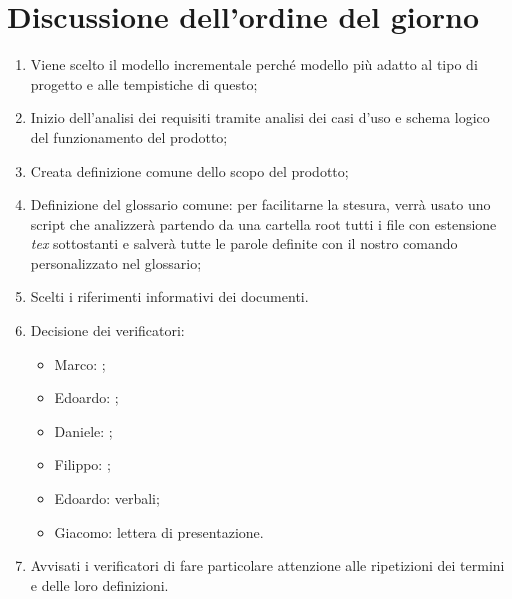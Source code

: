 \documentclass[../verbale-2016-12-19.tex]{subfiles}
\begin{document}
	\section{Discussione dell'ordine del giorno}
	\begin{enumerate}
		\item Viene scelto il modello incrementale perché modello più adatto al tipo di progetto e alle tempistiche di questo;
		\item Inizio dell'analisi dei requisiti tramite analisi dei casi d'uso e schema logico del funzionamento del prodotto;
		\item Creata definizione comune dello scopo del prodotto;
		\item Definizione del glossario comune: per facilitarne la stesura, verrà usato uno script che analizzerà partendo da una cartella root tutti i file con estensione \textit{tex} sottostanti e salverà tutte le parole definite con il nostro comando personalizzato nel glossario;
		\item Scelti i riferimenti informativi dei documenti.
		\item Decisione dei verificatori:
			\begin{itemize}
				\item Marco: \normediprogetto;
				\item Edoardo: \studiodifattibilita;
				\item Daniele: \pianodiqualifica;
				\item Filippo: \pianodiprogetto;
				\item Edoardo: verbali;
				\item Giacomo: lettera di presentazione.
			\end{itemize}
		\item Avvisati i verificatori di fare particolare attenzione alle ripetizioni dei termini e delle loro definizioni.
	\end{enumerate}
\end{document}
